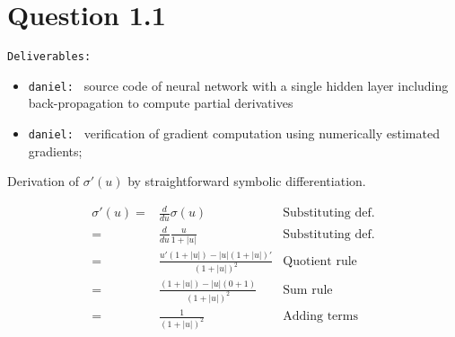 \section*{Question 1.1}

\texttt{Deliverables:}
\begin{itemize}
	
	\item \texttt{daniel: } source code of neural network with a single hidden layer including back-propagation to compute partial derivatives
	
	\item \texttt{daniel: } verification of gradient computation using numerically estimated gradients;
\end{itemize}

Derivation of $\sigma'(u)$ by straightforward symbolic
differentiation.

\begin{align*}
  \sigma'(u)=&\frac{d}{du}\sigma(u) & \text{Substituting def.} \\
  =&\frac{d}{du}\frac{u}{1+|u|} & \text{Substituting def.} \\
  =&\frac{u'(1+|u|)-|u|(1+|u|)'}{(1+|u|)^2} & \text{Quotient rule}\\
  =&\frac{(1+|u|)-|u|(0+1)}{(1+|u|)^2} & \text{Sum rule}\\
  =&\frac{1}{(1+|u|)^2} & \text{Adding terms}\\
\end{align*}
